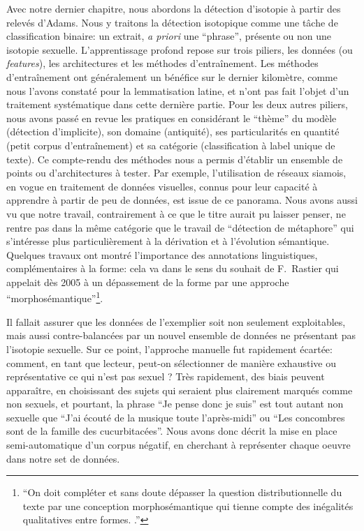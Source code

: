 Avec notre dernier chapitre, nous abordons la détection d'isotopie à partir des relevés d'Adams. Nous y traitons la détection isotopique comme une tâche de classification binaire: un extrait, \textit{a priori} une \enquote{phrase}, présente ou non une isotopie sexuelle. L'apprentissage profond repose sur trois piliers, les données (ou \textit{features}), les architectures et les méthodes d'entraînement. Les méthodes d'entraînement ont généralement un bénéfice sur le dernier kilomètre, comme nous l'avons constaté pour la lemmatisation latine, et n'ont pas fait l'objet d'un traitement systématique dans cette dernière partie. Pour les deux autres piliers, nous avons passé en revue les pratiques en considérant le \enquote{thème} du modèle (détection d'implicite), son domaine (antiquité), ses particularités en quantité (petit corpus d'entraînement) et sa catégorie (classification à label unique de texte). Ce compte-rendu des méthodes nous a permis d'établir un ensemble de points ou d'architectures à tester. Par exemple, l'utilisation de réseaux siamois, en vogue en traitement de données visuelles, connus pour leur capacité à apprendre à partir de peu de données, est issue de ce panorama. Nous avons aussi vu que notre travail, contrairement à ce que le titre aurait pu laisser penser, ne rentre pas dans la même catégorie que le travail de \enquote{détection de métaphore} qui s'intéresse plus particulièrement à la dérivation et à l'évolution sémantique. Quelques travaux ont montré l'importance des annotations linguistiques, complémentaires à la forme: cela va dans le sens du souhait de F.~Rastier qui appelait dès 2005 à un dépassement de la forme par une approche \enquote{morphosémantique}\footnote{\enquote{On doit compléter et sans doute dépasser la question distributionnelle du texte par une conception morphosémantique qui tienne compte des inégalités qualitatives entre formes. \textcite[p.~100]{rastier2005enjeux}.}}.

Il fallait assurer que les données de l'exemplier soit non seulement exploitables, mais aussi contre-balancées par un nouvel ensemble de données ne présentant pas l'isotopie sexuelle. Sur ce point, l'approche manuelle fut rapidement écartée: comment, en tant que lecteur, peut-on sélectionner de manière exhaustive ou représentative ce qui n'est pas sexuel ? Très rapidement, des biais peuvent apparaître, en choisissant des sujets qui seraient plus clairement marqués comme non sexuels, et pourtant, la phrase \enquote{Je pense donc je suis} est tout autant non sexuelle que \enquote{J'ai écouté de la musique toute l'après-midi} ou \enquote{Les concombres sont de la famille des cucurbitacées}. Nous avons donc décrit la mise en place semi-automatique d'un corpus négatif, en cherchant à représenter chaque oeuvre dans notre set de données. 

